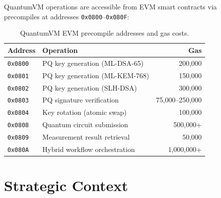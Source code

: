 \documentclass[11pt,letterpaper]{article}
\begin{document}
QuantumVM operations are accessible from EVM smart contracts via precompiles at addresses \texttt{0x0800}--\texttt{0x080F}:

\begin{table}[H]
\centering
\begin{tabular}{@{}llr@{}}
\toprule
\textbf{Address} & \textbf{Operation} & \textbf{Gas} \\
\midrule
\texttt{0x0800} & PQ key generation (ML-DSA-65) & 200,000 \\
\texttt{0x0801} & PQ key generation (ML-KEM-768) & 150,000 \\
\texttt{0x0802} & PQ key generation (SLH-DSA) & 300,000 \\
\texttt{0x0803} & PQ signature verification & 75,000--250,000 \\
\texttt{0x0804} & Key rotation (atomic swap) & 100,000 \\
\texttt{0x0808} & Quantum circuit submission & 500,000+ \\
\texttt{0x0809} & Measurement result retrieval & 50,000 \\
\texttt{0x080A} & Hybrid workflow orchestration & 1,000,000+ \\
\bottomrule
\end{tabular}
\caption{QuantumVM EVM precompile addresses and gas costs.}
\label{tab:quantumvm-precompiles}
\end{table}

\section{Strategic Context}
\end{document}
